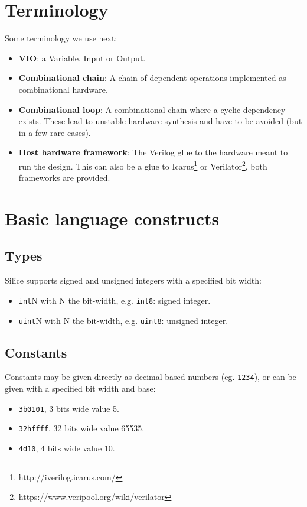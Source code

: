 \documentclass[a4]{article}
\newcommand\verilog{Verilog}
\newcommand\silice{Silice}
\begin{document}
\tableofcontents


\section{Terminology}
Some terminology we use next:
\begin{itemize}
\item \textbf{VIO}: a Variable, Input or Output.
\item \textbf{Combinational chain}: A chain of dependent operations implemented
as combinational hardware.
\item \textbf{Combinational loop}: A combinational chain where a cyclic dependency exists. These lead to unstable hardware synthesis and have to be avoided (but in a few rare cases).
\item \textbf{Host hardware framework}: The \verilog{} glue to the hardware meant to run the design. This can also be a glue to Icarus\footnote{http://iverilog.icarus.com/} or Verilator\footnote{https://www.veripool.org/wiki/verilator}, both frameworks are provided.
\end{itemize}


\section{Basic language constructs}

\subsection{Types}
\label{sec:types}

\silice{} supports signed and unsigned integers with a specified bit width:

\begin{itemize}
	\item \texttt{int}N with N the bit-width, e.g. \texttt{int8}: signed integer.
	\item \texttt{uint}N with N the bit-width, e.g. \texttt{uint8}: unsigned integer.
\end{itemize}

\subsection{Constants}
\label{sec:csts}

Constants may be given directly as decimal based numbers (eg. \texttt{1234}), or
can be given with a specified bit width and base:
\begin{itemize}
	\item \texttt{3b0101}, 3 bits wide value 5.
	\item \texttt{32hffff}, 32 bits wide value 65535.
	\item \texttt{4d10}, 4 bits wide value 10.
\end{itemize}
\end{document}
